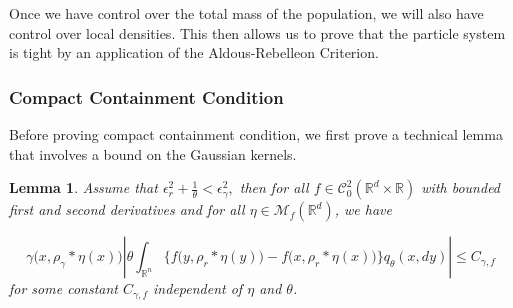 \documentclass[12pt]{article}
\newtheorem{lemma}[theorem]{Lemma}
\begin{document}
Once we have control over the total mass of the population, 
we will also have control over local densities.
This then allows us to prove that the particle system is tight
by an application of the Aldous-Rebelleon Criterion.

\subsubsection{Compact Containment Condition}
Before proving compact containment condition,
we first prove a technical lemma that involves a bound on the Gaussian kernels.
\begin{lemma}
    \label{lem: gamma - r radius comparison}
    Assume that $\epsilon_{r}^2 + \frac{1}{\theta} < \epsilon_{\gamma}^2,$ then
    for all $f \in \mathcal{C}^{2}_{0}(\mathbb{R}^d \times \mathbb{R})$
    with bounded first and second derivatives
    and for all $\eta \in \mathcal{M}_{f}(\mathbb{R}^d)$, we have 
    
    \begin{equation}\label{eq: gamma - r radius comparison bound}
    \gamma\big(x,\rho_{\gamma}*\eta(x)\big)
    \left| \theta 
        \int_{\mathbb{R}^n} 
            \big\{
                f\big(y,\rho_{r}*\eta(y)\big)-f\big(x,\rho_{r}*\eta(x)\big)
            \big\}
        q_{\theta}(x,dy)
    \right|
    \leq C_{\gamma, f}    
    \end{equation}
    for some constant $C_{\gamma,f}$ independent of $\eta$ and $\theta$. 
\end{lemma}
\end{document}
